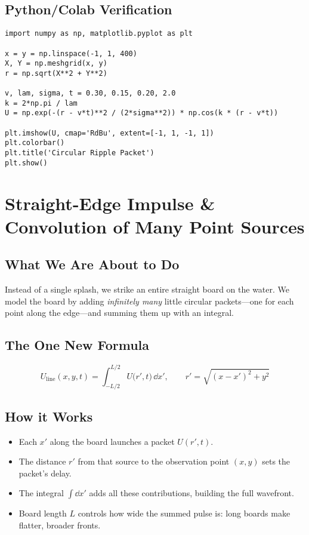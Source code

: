 \documentclass[12pt]{article}
\begin{document}
\subsection*{Python/Colab Verification}
\begin{lstlisting}[caption=Circular packet,label=lst:packet]
import numpy as np, matplotlib.pyplot as plt

x = y = np.linspace(-1, 1, 400)
X, Y = np.meshgrid(x, y)
r = np.sqrt(X**2 + Y**2)

v, lam, sigma, t = 0.30, 0.15, 0.20, 2.0
k = 2*np.pi / lam
U = np.exp(-(r - v*t)**2 / (2*sigma**2)) * np.cos(k * (r - v*t))

plt.imshow(U, cmap='RdBu', extent=[-1, 1, -1, 1])
plt.colorbar()
plt.title('Circular Ripple Packet')
plt.show()
\end{lstlisting}

\section{Straight-Edge Impulse \& Convolution of Many Point Sources}

\subsection*{What We Are About to Do}
Instead of a single splash, we strike an entire straight board on the water.  
We model the board by adding \emph{infinitely many} little circular packets—one for each point along the edge—and summing them up with an integral.

\subsection*{The One New Formula}
\begin{equation}
U_{\text{line}}(x,y,t)=\int_{-L/2}^{L/2}
U\!\bigl(r',t\bigr)\,\dd x', \qquad
r'=\sqrt{(x-x')^{2}+y^{2}}
\end{equation}

\subsection*{How it Works}
\begin{itemize}
  \item Each \(x'\) along the board launches a packet \(U(r',t)\).
  \item The distance \(r'\) from that source to the observation point \((x,y)\) sets the packet’s delay.
  \item The integral \(\int\dd x'\) adds all these contributions, building the full wavefront.
  \item Board length \(L\) controls how wide the summed pulse is: long boards make flatter, broader fronts.
\end{itemize}
\end{document}
